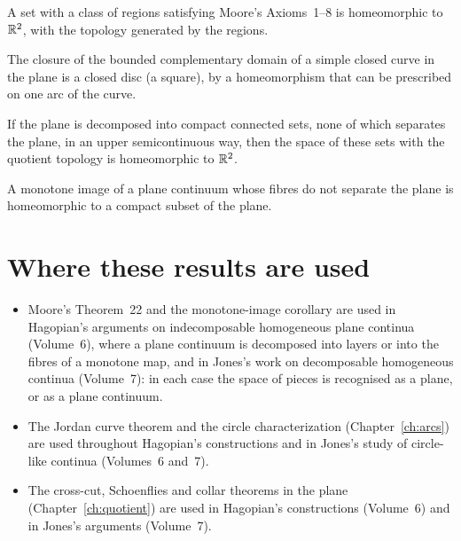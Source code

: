 \begin{theorem}
A set with a class of regions satisfying Moore's Axioms~1--8 is homeomorphic to $\mathbb{R}^2$, with the
topology generated by the regions.
\end{theorem}

\begin{theorem}
The closure of the bounded complementary domain of a simple closed curve in the plane is a closed disc
(a square), by a homeomorphism that can be prescribed on one arc of the curve.
\end{theorem}

\begin{theorem}
If the plane is decomposed into compact connected sets, none of which separates the plane, in an upper
semicontinuous way, then the space of these sets with the quotient topology is homeomorphic to $\mathbb{R}^2$.
\end{theorem}

\begin{corollary}
A monotone image of a plane continuum whose fibres do not separate the plane is homeomorphic to a compact
subset of the plane.
\end{corollary}

\section{Where these results are used}

\begin{itemize}
\item Moore's Theorem~22 and the monotone-image corollary are used in Hagopian's arguments on
indecomposable homogeneous plane continua (Volume~6), where a plane continuum is decomposed into layers or
into the fibres of a monotone map, and in Jones's work on decomposable homogeneous continua (Volume~7):
in each case the space of pieces is recognised as a plane, or as a plane continuum.
\item The Jordan curve theorem and the circle characterization (Chapter~\ref{ch:arcs}) are used throughout
Hagopian's constructions and in Jones's study of circle-like continua (Volumes~6 and~7).
\item The cross-cut, Schoenflies and collar theorems in the plane (Chapter~\ref{ch:quotient}) are used in
Hagopian's constructions (Volume~6) and in Jones's arguments (Volume~7).
\end{itemize}

